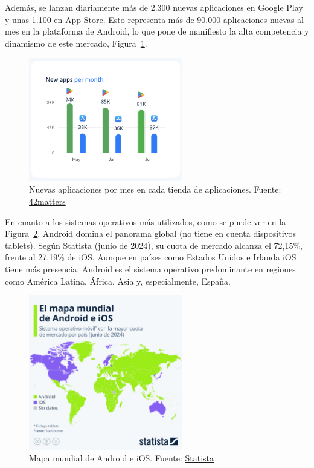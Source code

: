 Además, se lanzan diariamente más de 2.300 nuevas aplicaciones en Google Play y unas 1.100 en App Store. Esto representa más de 90.000 aplicaciones nuevas al mes en la plataforma de Android, lo que pone de manifiesto la alta competencia y dinamismo de este mercado, Figura~\ref{fig:apps_per_month}.

\begin{figure}[H]
\centering
\includegraphics[width=0.6\textwidth]{./img/intro/apps_per_month.png}
\caption{Nuevas aplicaciones por mes en cada tienda de aplicaciones. Fuente: \href{https://42matters.com/stats\#apps-by-category}{42matters}}
\label{fig:apps_per_month}
\end{figure}

En cuanto a los sistemas operativos más utilizados, como se puede ver en la Figura~\ref{fig:world_map_ios_android}, Android domina el panorama global (no tiene en cuenta dispositivos tablets). Según Statista (junio de 2024), su cuota de mercado alcanza el 72,15\%, frente al 27,19\% de iOS. Aunque en países como Estados Unidos e Irlanda iOS tiene más presencia, Android es el sistema operativo predominante en regiones como América Latina, África, Asia y, especialmente, España.

\begin{figure}[H]
\centering
\includegraphics[width=0.6\textwidth]{./img/intro/world_map_ios_android.jpeg}
\caption{Mapa mundial de Android e iOS.  Fuente: \href{https://www.statista.com}{Statista}}
\label{fig:world_map_ios_android}
\end{figure}

